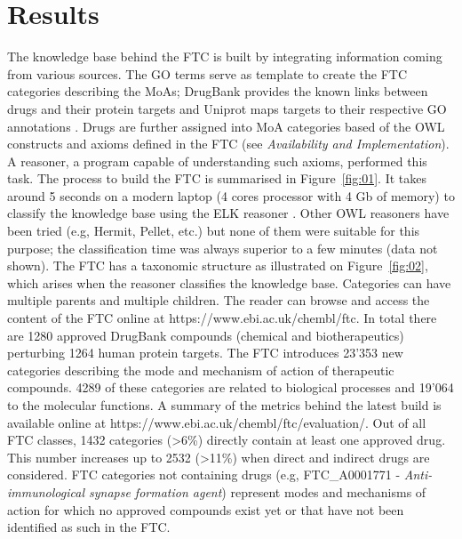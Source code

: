 \documentclass{bioinfo}
\begin{document}
\section{Results}

The knowledge base behind the FTC is built by integrating information coming from various sources. 
The GO terms serve as template to create the FTC categories describing the MoAs; DrugBank \citep{Knox2011} provides the 
known links between drugs and their protein targets and Uniprot \citep{TheUniprotConsortium2013} maps targets to their 
respective GO annotations \citep{Dimmer2012}. 
Drugs are further assigned into MoA categories based of the OWL constructs and axioms defined in the 
FTC (see \emph{Availability and Implementation}). A reasoner, a program capable of understanding such axioms, performed this task. 
The process to build the FTC is summarised in Figure~\ref{fig:01}.
It takes around 5 seconds on a modern 
laptop (4 cores processor with 4 Gb of memory) to classify the knowledge base using the ELK reasoner \citep{Kazakov2011}. 
Other OWL reasoners have been tried (e.g, Hermit, Pellet, etc.) but none of them were suitable for this purpose; 
the classification time was always superior to a few minutes (data not shown). The FTC has a taxonomic structure as illustrated 
on Figure~\ref{fig:02}, which arises when the reasoner classifies the knowledge base. Categories can have multiple parents and multiple children. 
The reader can browse and access the content of the FTC online at {{https://www.ebi.ac.uk/chembl/ftc}}.
In total there are 1280 approved DrugBank compounds (chemical and biotherapeutics) perturbing 1264 human protein targets. 
The FTC introduces 23'353 new categories describing the mode and mechanism of action of therapeutic compounds. 4289 of these 
categories are related to biological processes and 19'064 to the molecular functions. A summary of the metrics behind the latest 
build is available online at {{https://www.ebi.ac.uk/chembl/ftc/evaluation/}}.
Out of all FTC classes, 1432 
categories (\textgreater 6\%) directly contain at least one approved drug. This number increases up to 2532 (\textgreater 11\%) 
when direct and 
indirect drugs are considered. FTC categories not containing drugs (e.g, FTC\_A0001771 - \emph{Anti-immunological synapse 
formation agent}) represent modes and mechanisms of action for which no approved compounds exist yet or that have not been identified 
as such in the FTC.
\end{document}
